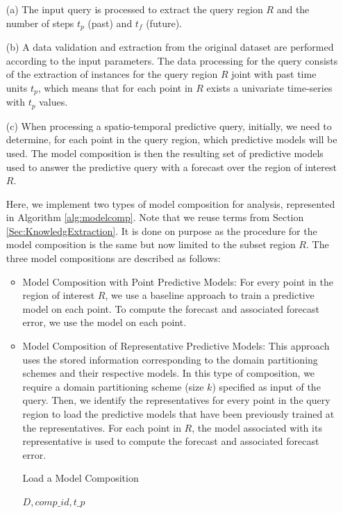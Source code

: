 \begin{itemize}
 \item [(a)] The input query is processed to extract the query region $R$ and the number of steps $t_p$ (past) and $t_f$ (future).
 \item [(b)] A data validation and extraction from the original dataset are performed according to the input parameters. The data processing for the query consists of the extraction of instances for the query region $R$ joint with past time units $t_{p}$, which means that for each point in $R$ exists a univariate time-series with $t_{p}$ values.
 \item [(c)] When processing a spatio-temporal predictive query, initially, we need to determine, for each point in the query region, which predictive models will be used. The model composition is then the resulting set of predictive models used to answer the predictive query with a forecast over the region of interest $R$. 
 
 Here, we implement two types of model composition for analysis, represented in Algorithm \ref{alg:modelcomp}. Note that we reuse terms from Section \ref{Sec:KnowledgExtraction}. It is done on purpose as the procedure for the model composition is the same but now limited to the subset region $R$. The three model compositions are described as follows:

 \begin{itemize}
	\item Model Composition with Point Predictive Models: For every point in the region of interest $R$, we use a baseline approach to train a predictive model on each point. To compute the forecast and associated forecast error, we use the model on each point.

	\item Model Composition of Representative Predictive Models: This approach uses the stored information corresponding to the domain partitioning schemes and their respective models. In this type of composition, we require a domain partitioning scheme (size $k$) specified as input of the query. Then, we identify the representatives for every point in the query region to load the predictive models that have been previously trained at the representatives. For each point in $R$, the model associated with its representative is used to compute the forecast and associated forecast error.
	
\begin{algorithm}[h!]
\caption{Load a Model Composition}\label{alg:modelcomp}
\begin{algorithmic}[1] 
 {$D, comp\_id, t\_p$}


\end{algorithmic}
\end{algorithm}
\end{itemize}
\end{itemize}
